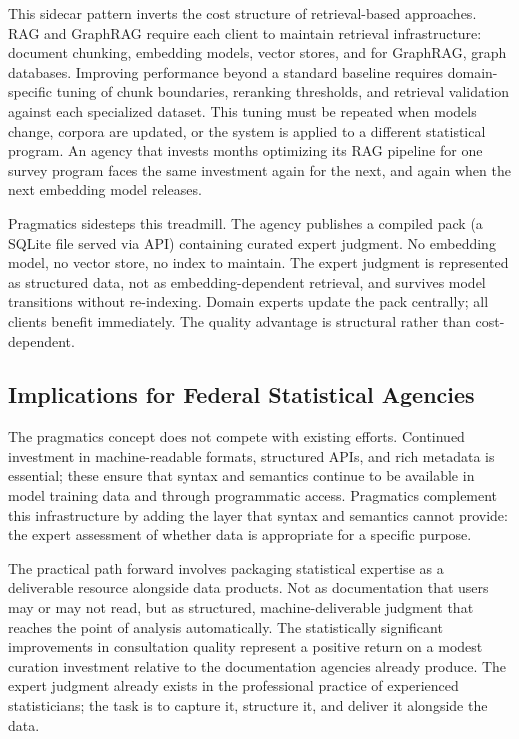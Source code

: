 \documentclass[
  11pt,
  letterpaper,
]{article}
\begin{document}
This sidecar pattern inverts the cost structure of retrieval-based
approaches. RAG and GraphRAG require each client to maintain retrieval
infrastructure: document chunking, embedding models, vector stores, and
for GraphRAG, graph databases. Improving performance beyond a standard
baseline requires domain-specific tuning of chunk boundaries, reranking
thresholds, and retrieval validation against each specialized dataset.
This tuning must be repeated when models change, corpora are updated, or
the system is applied to a different statistical program. An agency that
invests months optimizing its RAG pipeline for one survey program faces
the same investment again for the next, and again when the next
embedding model releases.

Pragmatics sidesteps this treadmill. The agency publishes a compiled
pack (a SQLite file served via API) containing curated expert judgment.
No embedding model, no vector store, no index to maintain. The expert
judgment is represented as structured data, not as embedding-dependent
retrieval, and survives model transitions without re-indexing. Domain
experts update the pack centrally; all clients benefit immediately. The
quality advantage is structural rather than cost-dependent.

\subsection{Implications for Federal Statistical
Agencies}\label{implications-for-federal-statistical-agencies}

The pragmatics concept does not compete with existing efforts. Continued
investment in machine-readable formats, structured APIs, and rich
metadata is essential; these ensure that syntax and semantics continue
to be available in model training data and through programmatic access.
Pragmatics complement this infrastructure by adding the layer that
syntax and semantics cannot provide: the expert assessment of whether
data is appropriate for a specific purpose.

The practical path forward involves packaging statistical expertise as a
deliverable resource alongside data products. Not as documentation that
users may or may not read, but as structured, machine-deliverable
judgment that reaches the point of analysis automatically. The
statistically significant improvements in consultation quality represent
a positive return on a modest curation investment relative to the
documentation agencies already produce. The expert judgment already
exists in the professional practice of experienced statisticians; the
task is to capture it, structure it, and deliver it alongside the data.
\end{document}
